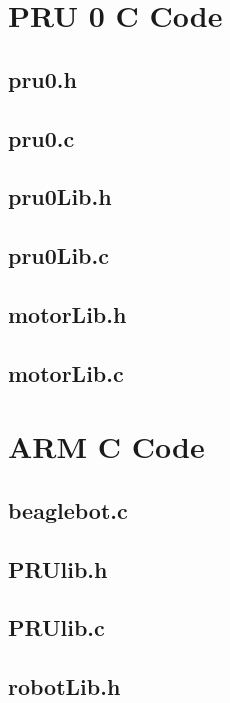 \documentclass[12pt,oneside,final]{siuethesis}
\theoremstyle{definition}
\begin{document}
\chapter{PRU 0 C Code}

\section{pru0.h}

\newpage
\section{pru0.c}

\newpage
\section{pru0Lib.h}

\newpage
\section{pru0Lib.c}

\newpage
\section{motorLib.h}

\newpage
\section{motorLib.c}


\chapter{ARM C Code}

\section{beaglebot.c}

\newpage
\section{PRUlib.h}

\newpage
\section{PRUlib.c}

\newpage
\section{robotLib.h}

\newpage
\end{document}
